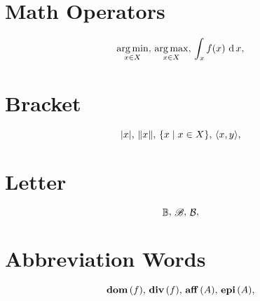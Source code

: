 \documentclass{article}
\begin{document}
\section{Math Operators}
\begin{equation}
    \mathop{\arg\min}_{x\in X},\,
    \mathop{\arg\max}_{x\in X},\,
    \int_x f(x) \mathop{\,\mathrm{d}} x,\,
\end{equation}


\section{Bracket}
\begin{equation}
    \mathop{\left| x \right|},\,
    \mathop{\left\| x \right\|},\,
    \mathop{\{ x \;|\; x\in X \}},\,
    \mathop{\left\langle x, y \right\rangle},\,
\end{equation}


\section{Letter}
\begin{equation}
    \mathop{\mathbb{B}},\,
    \mathop{\mathscr{B}},\,
    \mathop{\mathcal{B}},\,
\end{equation}


\section{Abbreviation Words}
\begin{equation}
    \mathop{\mathbf{dom}\left( f \right)},\,
    \mathop{\mathbf{div}\left( f \right)},\,
    \mathop{\mathbf{aff}\left( A \right)},\,
    \mathop{\mathbf{epi}\left( A \right)},\,
\end{equation}
\end{document}
